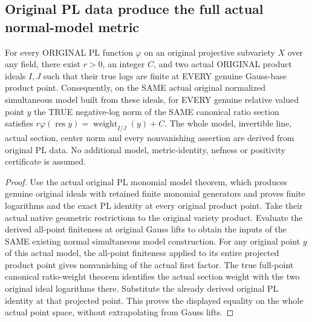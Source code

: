 \subsection{Original PL data produce the full actual normal-model metric}

\begin{theorem}
\label{local:actual-pl-whole-normal-ratio-metric}
\leanok
{}
For every ORIGINAL PL function $\varphi$ on an original projective
subvariety $X$ over any field, there exist $r>0$, an integer $C$,
and two actual ORIGINAL product ideals $I,J$ such that their true logs
are finite at EVERY genuine Gauss-base product point. Consequently, on
the SAME actual original normalized simultaneous model built from these
ideals, for EVERY genuine relative valued point $y$ the TRUE negative-log
norm of the SAME canonical ratio section satisfies
$r\varphi(\operatorname{res}y)=\operatorname{weight}_{I/J}(y)+C$.
The whole model, invertible line, actual section, center norm and every
nonvanishing assertion are derived from original PL data. No additional
model, metric-identity, nefness or positivity certificate is assumed.
\end{theorem}
\begin{proof}
Use the actual original PL monomial model theorem, which produces genuine
original ideals with retained finite monomial generators and proves
finite logarithms and the exact PL identity at every original product
point. Take their actual native geometric restrictions to the original
variety product. Evaluate the derived all-point finiteness at original
Gauss lifts to obtain the inputs of the SAME existing normal simultaneous
model construction. For any original point $y$ of this actual model, the
all-point finiteness applied to its entire projected product point gives
nonvanishing of the actual first factor. The true full-point canonical
ratio-weight theorem identifies the actual section weight with the two
original ideal logarithms there. Substitute the already derived original
PL identity at that projected point. This proves the displayed equality
on the whole actual point space, without extrapolating from Gauss lifts.
\end{proof}

